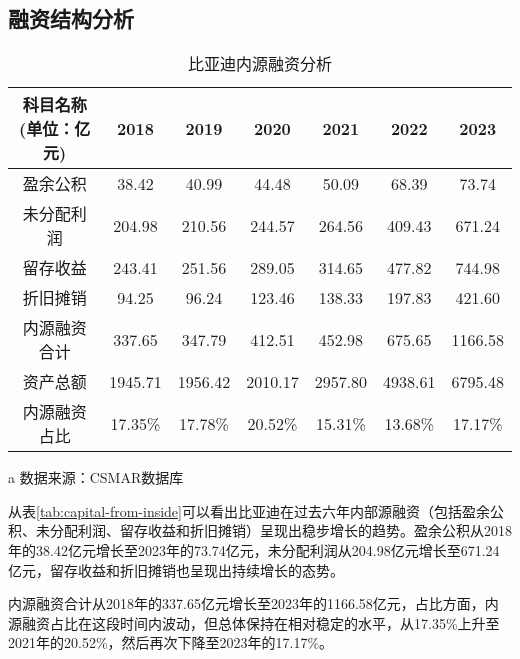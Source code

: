 \subsection{融资结构分析}
\begin{table}
  \centering
  \begin{threeparttable}[c]
    \caption{比亚迪内源融资分析}
    \label{tab:capital-from-inside}
    \begin{tabular}{ccccccc}
      \toprule
        科目名称(单位：亿元) & 2018 & 2019 & 2020 & 2021 & 2022 & 2023 \\ 
      \midrule
        盈余公积 & 38.42  & 40.99  & 44.48  & 50.09  & 68.39  & 73.74  \\ 
        未分配利润 & 204.98  & 210.56  & 244.57  & 264.56  & 409.43  & 671.24  \\ 
        留存收益 & 243.41  & 251.56  & 289.05  & 314.65  & 477.82  & 744.98  \\ 
        折旧摊销 & 94.25  & 96.24  & 123.46  & 138.33  & 197.83  & 421.60  \\ 
        内源融资合计 & 337.65  & 347.79  & 412.51  & 452.98  & 675.65  & 1166.58  \\ 
        资产总额 & 1945.71  & 1956.42  & 2010.17  & 2957.80  & 4938.61  & 6795.48  \\ 
        内源融资占比 & 17.35\% & 17.78\% & 20.52\% & 15.31\% & 13.68\% & 17.17\% \\ 
      \bottomrule
    \end{tabular}
    \begin{tablenotes}
      \item [a] 数据来源：CSMAR数据库
    \end{tablenotes}
  \end{threeparttable}
\end{table}
从表\eqref{tab:capital-from-inside}可以看出比亚迪在过去六年内部源融资（包括盈余公积、未分配利润、留存收益和折旧摊销）呈现出稳步增长的趋势。盈余公积从2018年的38.42亿元增长至2023年的73.74亿元，未分配利润从204.98亿元增长至671.24亿元，留存收益和折旧摊销也呈现出持续增长的态势。

内源融资合计从2018年的337.65亿元增长至2023年的1166.58亿元，占比方面，内源融资占比在这段时间内波动，但总体保持在相对稳定的水平，从17.35\%上升至2021年的20.52\%，然后再次下降至2023年的17.17\%。

